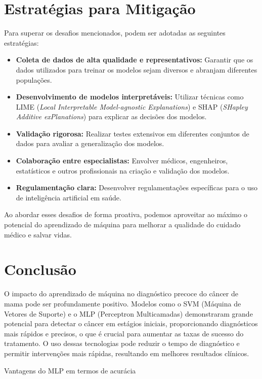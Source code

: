 \documentclass[12pt,a4paper,oneside,openany]{article}
\begin{document}
\section*{Estratégias para Mitigação}
Para superar os desafios mencionados, podem ser adotadas as seguintes estratégias:

\begin{itemize}
    \item \textbf{Coleta de dados de alta qualidade e representativos:} Garantir que os dados utilizados para treinar os modelos sejam diversos e abranjam diferentes populações.
    \item \textbf{Desenvolvimento de modelos interpretáveis:} Utilizar técnicas como LIME (\textit{Local Interpretable Model-agnostic Explanations}) e SHAP (\textit{SHapley Additive exPlanations}) para explicar as decisões dos modelos.
    \item \textbf{Validação rigorosa:} Realizar testes extensivos em diferentes conjuntos de dados para avaliar a generalização dos modelos.
    \item \textbf{Colaboração entre especialistas:} Envolver médicos, engenheiros, estatísticos e outros profissionais na criação e validação dos modelos.
    \item \textbf{Regulamentação clara:} Desenvolver regulamentações específicas para o uso de inteligência artificial em saúde.
\end{itemize}

\noindent
Ao abordar esses desafios de forma proativa, podemos aproveitar ao máximo o potencial do aprendizado de máquina para melhorar a qualidade do cuidado médico e salvar vidas.

\section{Conclusão}

O impacto do aprendizado de máquina no diagnóstico precoce do câncer de mama pode ser profundamente positivo. Modelos como o SVM (Máquina de Vetores de Suporte) e o MLP (Perceptron Multicamadas) demonstraram grande potencial para detectar o câncer em estágios iniciais, proporcionando diagnósticos mais rápidos e precisos, o que é crucial para aumentar as taxas de sucesso do tratamento. O uso dessas tecnologias pode reduzir o tempo de diagnóstico e permitir intervenções mais rápidas, resultando em melhores resultados clínicos.

\noindent
Vantagens do MLP em termos de acurácia
\end{document}
